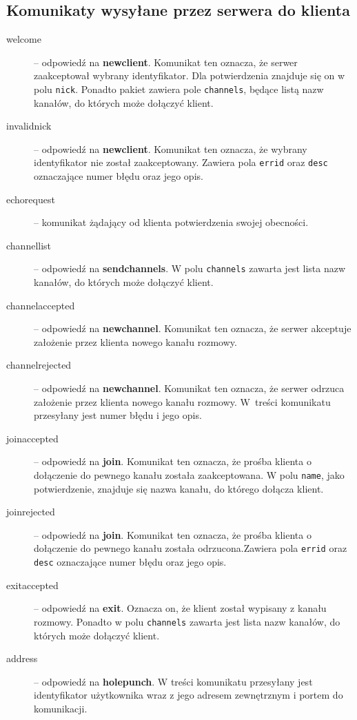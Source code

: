\documentclass[a4paper, 10pt]{article}
\begin{document}
\subsection{Komunikaty wysyłane przez serwera do klienta}
\begin{description}
 \item[welcome] -- odpowiedź na \textbf{newclient}. Komunikat ten oznacza, że serwer zaakceptował wybrany identyfikator. Dla potwierdzenia znajduje się on w polu \texttt{nick}. Ponadto pakiet zawiera pole \texttt{channels}, będące listą nazw kanałów, do których może dołączyć klient. 
 \item[invalidnick] -- odpowiedź na \textbf{newclient}. Komunikat ten oznacza, że wybrany identyfikator nie został zaakceptowany. Zawiera pola \texttt{errid} oraz \texttt{desc} oznaczające numer błędu oraz jego opis.
 \item[echorequest] -- komunikat żądający od klienta potwierdzenia swojej obecności.
 \item[channellist] -- odpowiedź na \textbf{sendchannels}. W polu \texttt{channels} zawarta jest lista nazw kanałów, do których może dołączyć klient.
 \item[channelaccepted] -- odpowiedź na \textbf{newchannel}. Komunikat ten oznacza, że serwer akceptuje założenie przez klienta nowego kanału rozmowy.
  \item[channelrejected] -- odpowiedź na \textbf{newchannel}. Komunikat ten oznacza, że serwer odrzuca założenie przez klienta nowego kanału rozmowy. W~treści komunikatu przesyłany jest numer błędu i jego opis.
 \item[joinaccepted] -- odpowiedź na \textbf{join}. Komunikat ten oznacza, że prośba klienta o dołączenie do pewnego kanału została zaakceptowana. W polu \texttt{name}, jako potwierdzenie, znajduje się nazwa kanału, do którego dołącza klient.
  \item[joinrejected] -- odpowiedź na \textbf{join}. Komunikat ten oznacza, że prośba klienta o dołączenie do pewnego kanału została odrzucona.Zawiera pola \texttt{errid} oraz \texttt{desc} oznaczające numer błędu oraz jego opis.
 \item[exitaccepted] -- odpowiedź na \textbf{exit}. Oznacza on, że klient został wypisany z kanału rozmowy. Ponadto w polu \texttt{channels} zawarta jest lista nazw kanałów, do których może dołączyć klient.
 \item[address] -- odpowiedź na \textbf{holepunch}. W treści komunikatu przesyłany jest identyfikator użytkownika wraz z jego adresem zewnętrznym i portem do komunikacji.

\end{description}
\end{document}

